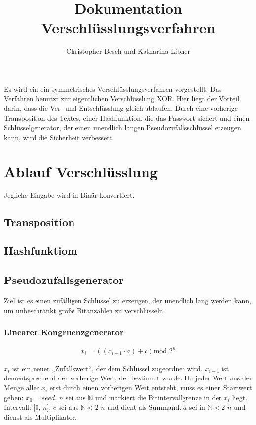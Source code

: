 \documentclass[10pt,a4paper]{article}
\author{Christopher Besch und Katharina Libner}
\title{Dokumentation Verschlüsslungsverfahren}
\begin{document}
\maketitle
\tableofcontents
\newpage

Es wird ein ein symmetrisches Verschlüsslungsverfahren vorgestellt. Das Verfahren benutzt zur eigentlichen Verschlüsslung XOR. Hier liegt der Vorteil darin, dass die Ver- und Entschlüsslung gleich ablaufen. Durch eine vorherige Transposition des Textes, einer Hashfunktion, die das Passwort sichert und einen Schlüsselgenerator, der einen unendlich langen Pseudozufallsschlüssel erzeugen kann, wird die Sicherheit verbessert. 
\section{Ablauf Verschlüsslung}
Jegliche Eingabe wird in Binär konvertiert. 
\subsection{Transposition}
\subsection{Hashfunktiom}
\subsection{Pseudozufallsgenerator}
Ziel ist es einen \glqq zufälligen\grqq{} Schlüssel zu erzeugen, der unendlich lang werden kann, um unbeschränkt große Bitanzahlen zu verschlüsseln.
\subsubsection{Linearer Kongruenzgenerator}
\begin{align*}
    x_i=\left(\left( x_{i-1}\cdot a\right) +c\right) \text{mod } 2^n
\end{align*}

$x_i$ ist ein neuer „Zufallswert“, der dem Schlüssel zugeordnet wird.
$x_{i-1}$ ist dementsprechend der vorherige Wert, der bestimmt wurde.
Da jeder Wert aus der Menge aller $x_i$ erst durch einen vorherigen Wert entsteht, muss es einen
Startwert geben: $x_0 = seed $.
$n$ sei aus $ \mathbb{N} $ und markiert die Bitintervallgrenze in der $x_i$
liegt. Intervall: [0, $n$].
$c$ sei aus  $ \mathbb{N}<2 $
$n$ und dient als Summand.
$a$ sei in $ \mathbb{N}< 2 $
$n$ und dienst als Multiplikator.
\end{document}
